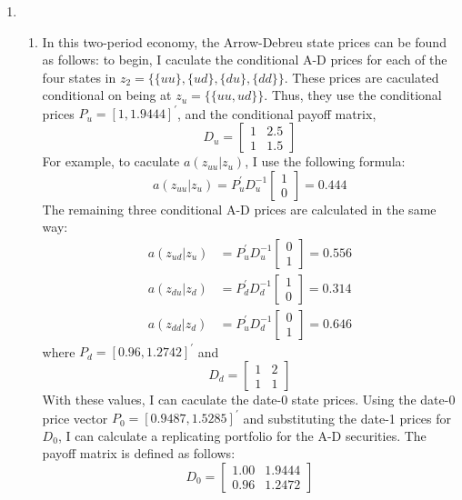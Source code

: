 \documentclass[11pt]{article}
\newcommand{\inv}[1]{#1^{-1}}
\begin{document}
\begin{enumerate}
	\item \begin{enumerate}
		\item In this two-period economy, the Arrow-Debreu state prices can be found as follows: to begin, I caculate the conditional A-D prices for each of the four states in \(z_2 = \{ \{uu\}, \{ud\}, \{du\}, \{dd\} \}\). These prices are caculated conditional on being at \(z_{u} = \{\{uu, ud\}\}\). Thus, they use the conditional prices \(P_u = [1, 1.9444]^\prime\), and the conditional payoff matrix,
		\[D_u = \begin{bmatrix}
			1 & 2.5 \\ 1 & 1.5
		\end{bmatrix}\]
		For example, to caculate \(a(z_{uu} | z_u)\), I use the following formula:
		\[a(z_{uu} | z_u) = P_u^\prime \inv{D_u} \begin{bmatrix}
			1 \\ 0
		\end{bmatrix} = 0.444\]
		The remaining three conditional A-D prices are calculated in the same way:
		\begin{align*}
			a(z_{ud} | z_u) &= P_u^\prime \inv{D_u} \begin{bmatrix} 0 \\ 1 \end{bmatrix} = 0.556 \\
			a(z_{du} | z_d) &= P_d^\prime \inv{D_d} \begin{bmatrix} 1 \\ 0 \end{bmatrix} = 0.314 \\
			a(z_{dd} | z_d) &= P_u^\prime \inv{D_d} \begin{bmatrix} 0 \\ 1 \end{bmatrix} = 0.646
		\end{align*}
		where \(P_d = [0.96, 1.2742]^\prime\) and 
		\[D_d = \begin{bmatrix}
			1 & 2 \\ 1 & 1
		\end{bmatrix}\]
		With these values, I can caculate the date-0 state prices. Using the date-0 price vector \(P_0 = [0.9487, 1.5285 ]^\prime\) and substituting the date-1 prices for \(D_0\), I can calculate a replicating portfolio for the A-D securities. The payoff matrix is defined as follows:
		\[D_0 = \begin{bmatrix}
			1.00 & 1.9444 \\ 0.96 & 1.2472
		\end{bmatrix}\]

\end{enumerate}
\end{enumerate}
\end{document}
